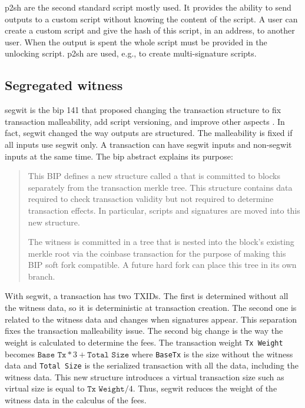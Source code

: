 \gls{p2sh} are the second standard script mostly used. It provides the ability
to send outputs to a custom script without knowing the content of the script.
A user can create a custom script and give the hash of this script, in an address,
to another user. When the output is spent the whole script must be provided in
the unlocking script. \gls{p2sh} are used, e.g., to create multi-signature scripts.

\subsection{Segregated witness}

\gls{segwit} is the \gls{bip} 141 that proposed changing the transaction
structure to fix transaction malleability, add script versioning, and improve
other aspects \cite{SegWit, SegWitBIP}. In fact, \gls{segwit} changed the way
outputs are structured. The malleability is fixed if all inputs use \gls{segwit}
only. A transaction can have \gls{segwit} inputs and non-\gls{segwit} inputs at
the same time. The \gls{bip} abstract explains its purpose:

\begin{quote}
  This BIP defines a new structure called a  that is committed to
  blocks separately from the transaction merkle tree. This structure contains
  data required to check transaction validity but not required to determine
  transaction effects. In particular, scripts and signatures are moved into this
  new structure.

  The witness is committed in a tree that is nested into the block's existing
  merkle root via the coinbase transaction for the purpose of making this BIP
  soft fork compatible. A future hard fork can place this tree in its own branch.
\end{quote}

With \gls{segwit}, a transaction has two TXIDs. The first is determined without
all the witness data, so it is deterministic at transaction creation. The
second one is related to the witness data and changes when signatures appear.
This separation fixes the transaction malleability issue. The second big change is the
way the weight is calculated to determine the fees. The transaction weight
\texttt{Tx Weight} becomes $\texttt{Base Tx} * 3 + \texttt{Total Size}$ where
\texttt{BaseTx} is the size without the witness data and \texttt{Total Size} is
the serialized transaction with all the data, including the witness data. This new structure introduces a
virtual transaction size such as virtual size is equal to $\texttt{Tx Weight} /
4$. Thus, \gls{segwit} reduces the weight of the witness data in the calculus of
the fees.

